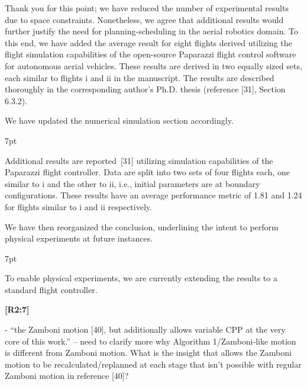 \documentclass[10pt]{letter}
\newenvironment{formal}{%
  \def\FrameCommand{%
    \hspace{1pt}%
    {\color{red}\vrule width 2pt}%
    {\color{formalshade}\vrule width 4pt}%
    \colorbox{formalshade}%
  }%
  \MakeFramed{\advance\hsize-\width\FrameRestore}%
  \noindent\hspace{-4.55pt}%
  \begin{adjustwidth}{}{7pt}%
  \vspace{2pt}\vspace{2pt}%
}
{%
  \vspace{2pt}\end{adjustwidth}\endMakeFramed%
}
\begin{document}
  {\color{blue} 
  
  {\hspace*{-4.5em}{[R2:6]}\vspace*{-1.9em}}

  Thank you for this point; we have reduced the number of experimental results due to space constraints. Nonetheless, we agree that additional results would further justify the need for planning-scheduling in the aerial robotics domain. To this end, we have added the average result for eight flights derived utilizing the flight simulation capabilities of the open-source Paparazzi flight control software for autonomous aerial vehicles. These results are derived in two equally sized sets, each similar to flights i and ii in the manuscript. The results are described thoroughly in the corresponding author's Ph.D. thesis (reference [{\color{green}31}], Section 6.3.2).
  
  We have updated the numerical simulation section accordingly.

  \begin{formal}
    {\color{blue}
    Additional results are reported~[{\color{green}31}] utilizing simulation capabilities of the Paparazzi flight controller. Data are split into two sets of four flights each, one similar to {\color{red}i} and the other to {\color{red}ii}, i.e., initial parameters are at boundary configurations.
    These results have an average performance metric of 1.81 and 1.24 for flights similar to {\color{red}i} and {\color{red}ii} respectively.}    

    \vspace*{1ex}
  \end{formal}

  We have then reorganized the conclusion, underlining the intent to perform physical experiments at future instances.
  
  \begin{formal}
  \color{black}
  {\color{blue}To enable physical experiments}, we are currently extending the results to a standard flight controller.
  \vspace*{-.8ex}
  \end{formal}
  }

{\hspace*{-4.5em}\textbf{[R2:7]}\vspace*{-1.9em}}

- ``the Zamboni motion [40], but additionally allows variable CPP at the very core of this work.'' -- need to clarify more why Algorithm 1/Zamboni-like motion is different from Zamboni motion. What is the   insight that allows the Zamboni motion to be recalculated/replanned at each stage that isn't possible with regular Zamboni motion in reference [40]? 
\end{document}
